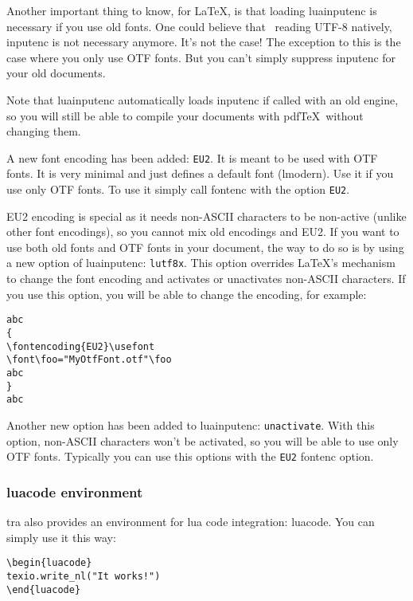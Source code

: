 \documentclass{article}
\begin{document}
Another important thing to know, for \LaTeX , is that loading \textsf{luainputenc} is necessary if you use old fonts. One could believe that \LuaTeX\ reading UTF-8 natively, \textsf{inputenc} is not necessary anymore. It's not the case! The exception to this is the case where you only use OTF fonts. But you can't simply suppress \textsf{inputenc} for your old documents.

Note that \textsf{luainputenc} automatically loads \textsf{inputenc} if called with an old engine, so you will still be able to compile your documents with pdf\TeX\ without changing them.

A new font encoding has been added: \texttt{EU2}. It is meant to be used with OTF fonts. It is very minimal and just defines a default font (lmodern). Use it if you use only OTF fonts. To use it simply call \textsf{fontenc} with the option \texttt{EU2}. 

EU2 encoding is special as it needs non-ASCII characters to be non-active (unlike other font encodings), so you cannot mix old encodings and EU2. If you want to use both old fonts and OTF fonts in your document, the way to do so is by using a new option of \textsf{luainputenc}: \texttt{lutf8x}. This option overrides \LaTeX 's mechanism to change the font encoding and activates or unactivates non-ASCII characters. If you use this option, you will be able to change the encoding, for example:

\begin{verbatim}
abc
{
\fontencoding{EU2}\usefont
\font\foo="MyOtfFont.otf"\foo
abc
}
abc
\end{verbatim} 

Another new option has been added to \textsf{luainputenc}: \texttt{unactivate}. With this option, non-ASCII characters won't be activated, so you will be able to use only OTF fonts. Typically you can use this options with the \texttt{EU2} \textsf{fontenc} option.

\subsubsection{luacode environment}

\LuaTeX tra also provides an environment for lua code integration: \textsf{luacode}. You can simply use it this way:

\begin{verbatim}
\begin{luacode}
texio.write_nl("It works!")
\end{luacode}
\end{verbatim}
\end{document}
